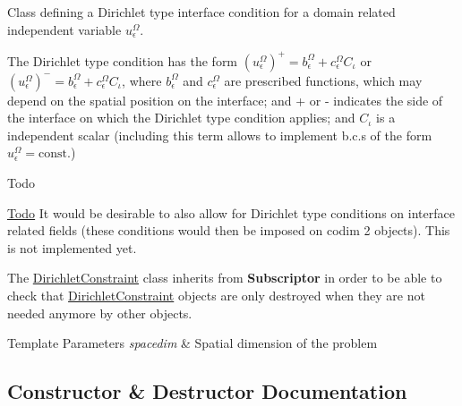 Class defining a Dirichlet type interface condition for a domain related independent variable $u^\Omega_\epsilon$.

The Dirichlet type condition has the form $ \left(u^\Omega_\epsilon\right)^+ = b^\Omega_\epsilon + c^\Omega_\epsilon C_\iota$ or $ \left(u^\Omega_\epsilon\right)^- = b^\Omega_\epsilon + c^\Omega_\epsilon C_\iota$, where $b^\Omega_\epsilon$ and $c^\Omega_\epsilon$ are prescribed functions, which may depend on the spatial position on the interface; and + or -\/ indicates the side of the interface on which the Dirichlet type condition applies; and $C_\iota$ is a independent scalar (including this term allows to implement b.\+c.\+s of the form $u^\Omega_\epsilon = \mathrm{const.}$)

\begin{DoxyRefDesc}{Todo}
\item[\hyperlink{todo__todo000008}{Todo}]It would be desirable to also allow for Dirichlet type conditions on interface related fields (these conditions would then be imposed on codim 2 objects). This is not implemented yet.\end{DoxyRefDesc}


The \hyperlink{class_dirichlet_constraint}{Dirichlet\+Constraint} class inherits from {\bf Subscriptor} in order to be able to check that \hyperlink{class_dirichlet_constraint}{Dirichlet\+Constraint} objects are only destroyed when they are not needed anymore by other objects.


\begin{DoxyTemplParams}{Template Parameters}
{\em spacedim} & Spatial dimension of the problem \\
\hline
\end{DoxyTemplParams}


\subsection{Constructor \& Destructor Documentation}
